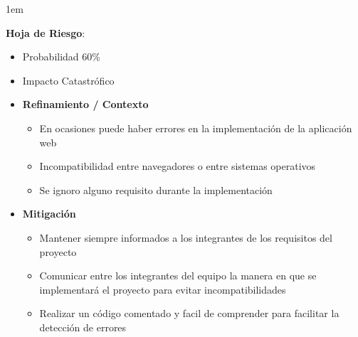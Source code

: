 \documentclass[12pt, fleqn]{report}                             %
\newenvironment{SmallIndentation}[1][0.75em]                    %
    {\begin{adjustwidth}{#1}{}\begin{footnotesize}}                 %
    {\end{footnotesize}\end{adjustwidth}}                           %
\begin{document}
                \begin{SmallIndentation}[1em]
                    \textbf{Hoja de Riesgo}:
                    
                    \begin{itemize}
                        \item Probabilidad 60\%
                        \item Impacto Catastrófico
                        \item
                            \textbf{Refinamiento / Contexto}
                            \begin{itemize}
                                \item 
                                    En ocasiones puede haber errores en la
                                    implementación de la aplicación web

                                \item
                                    Incompatibilidad entre navegadores o entre
                                    sistemas operativos

                                \item
                                    Se ignoro alguno requisito durante la
                                    implementación
                            \end{itemize}
                        \item
                            \textbf{Mitigación}
                            \begin{itemize}
                                \item 
                                    Mantener siempre informados a los integrantes
                                    de los requisitos del proyecto

                                \item
                                    Comunicar entre los integrantes del equipo
                                    la manera en que se implementará el proyecto
                                    para evitar incompatibilidades

                                \item
                                    Realizar un código comentado y facil de 
                                    comprender para facilitar la detección de 
                                    errores
                            \end{itemize}


\end{itemize}
\end{SmallIndentation}
\end{document}
